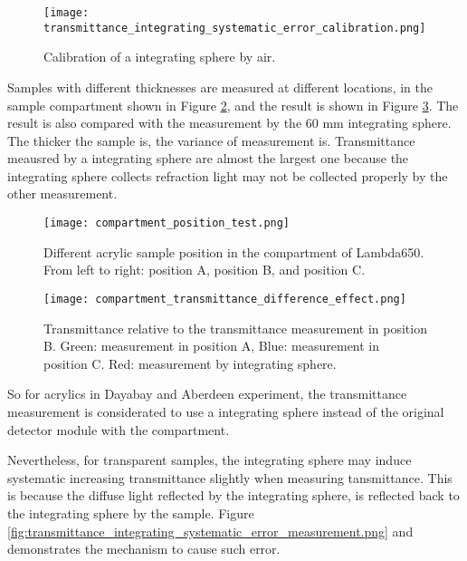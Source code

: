 \begin{figure}
    \centering
    \texttt{[image: transmittance\_integrating\_systematic\_error\_calibration.png]}
    \caption{Calibration of a integrating sphere by air.}
    \label{fig:transmittance_integrating_systematic_error_calibration.png}
    \end{figure}




Samples with different thicknesses are measured at different locations, in the sample compartment shown in Figure \ref{compartment_position_test.png},
and the result is shown in Figure \ref{compartment_transmittance_difference_effect.png}.
The result is also compared with the measurement by the 60 mm integrating sphere.
The thicker the sample is, the variance of
measurement is. Transmittance meausred by a integrating sphere
are almost the largest one because the integrating sphere collects refraction light may
not be collected properly by the other measurement.

\begin{figure}
    \centering
    \texttt{[image: compartment\_position\_test.png]}
    \caption{Different acrylic sample position in the compartment of Lambda650. From
 left to right: position A, position B, and position C.}
    \label{compartment_position_test.png}
    \end{figure}


\begin{figure}
    \centering
    \texttt{[image: compartment\_transmittance\_difference\_effect.png]}
    \caption{Transmittance relative to the transmittance measurement in position B. Green: measurement in position A, Blue:
 measurement in position C. Red: measurement by integrating sphere.}
    \label{compartment_transmittance_difference_effect.png}
    \end{figure}


So for acrylics in Dayabay and Aberdeen experiment, the transmittance measurement is
considerated to use a integrating sphere instead of the original detector module with the compartment.

Nevertheless, for transparent samples, the integrating sphere
may induce systematic increasing transmittance slightly when measuring tansmittance.
This is because the diffuse light reflected by the integrating
sphere, is reflected back to the integrating sphere by the sample.
Figure \ref{fig:transmittance_integrating_systematic_error_measurement.png} and
demonstrates the mechanism to cause such error.

